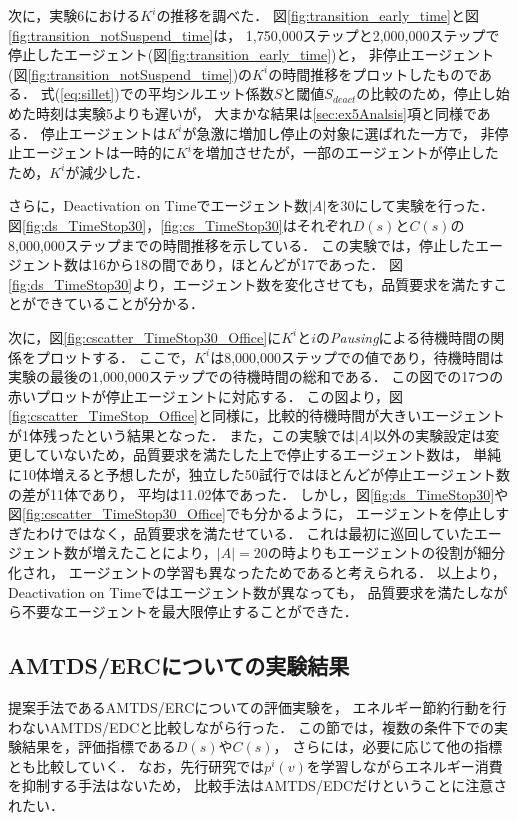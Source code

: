 \documentclass[12pt,a4j,twoside]{jarticle}
\begin{document}
  次に，実験6における$K^i$の推移を調べた．
  図\ref{fig:transition_early_time}と図\ref{fig:transition_notSuspend_time}は，
  1,750,000ステップと2,000,000ステップで停止したエージェント(図\ref{fig:transition_early_time})と，
  非停止エージェント(図\ref{fig:transition_notSuspend_time})の$K^i$の時間推移をプロットしたものである．
  式(\ref{eq:sillet})での平均シルエット係数$S$と閾値$S_{deact}$の比較のため，停止し始めた時刻は実験5よりも遅いが，
  大まかな結果は\ref{sec:ex5Analsis}項と同様である．
  停止エージェントは$K^i$が急激に増加し停止の対象に選ばれた一方で，
  非停止エージェントは一時的に$K^i$を増加させたが，一部のエージェントが停止したため，$K^i$が減少した．
  \par

  さらに，Deactivation on Timeでエージェント数$|A|$を30にして実験を行った．
  図\ref{fig:ds_TimeStop30}，\ref{fig:cs_TimeStop30}はそれぞれ$D(s)$と$C(s)$の8,000,000ステップまでの時間推移を示している．
  この実験では，停止したエージェント数は16から18の間であり，ほとんどが17であった．
  図\ref{fig:ds_TimeStop30}より，エージェント数を変化させても，品質要求を満たすことができていることが分かる．
  \par

  次に，図\ref{fig:cscatter_TimeStop30_Office}に$K^i$と$i$の{\em Pausing}による待機時間の関係をプロットする．
  ここで，$K^i$は8,000,000ステップでの値であり，待機時間は実験の最後の1,000,000ステップでの待機時間の総和である．
  この図での17つの赤いプロットが停止エージェントに対応する．
  この図より，図\ref{fig:cscatter_TimeStop_Office}と同様に，比較的待機時間が大きいエージェントが1体残ったという結果となった．
  また，この実験では$|A|$以外の実験設定は変更していないため，品質要求を満たした上で停止するエージェント数は，
  単純に10体増えると予想したが，独立した50試行ではほとんどが停止エージェント数の差が11体であり，
  平均は11.02体であった．
  しかし，図\ref{fig:ds_TimeStop30}や図\ref{fig:cscatter_TimeStop30_Office}でも分かるように，
  エージェントを停止しすぎたわけではなく，品質要求を満たせている．
  これは最初に巡回していたエージェント数が増えたことにより，$|A|=20$の時よりもエージェントの役割が細分化され，
  エージェントの学習も異なったためであると考えられる．
  以上より，Deactivation on Timeではエージェント数が異なっても，
  品質要求を満たしながら不要なエージェントを最大限停止することができた．

  
  \subsection{AMTDS/ERCについての実験結果}\label{result_ERC}
  提案手法であるAMTDS/ERCについての評価実験を，
  エネルギー節約行動を行わないAMTDS/EDCと比較しながら行った．
  この節では，複数の条件下での実験結果を，評価指標である$D(s)$や$C(s)$，
  さらには，必要に応じて他の指標とも比較していく．
  なお，先行研究では$p^i(v)$を学習しながらエネルギー消費を抑制する手法はないため，
  比較手法はAMTDS/EDCだけということに注意されたい．
\end{document}
